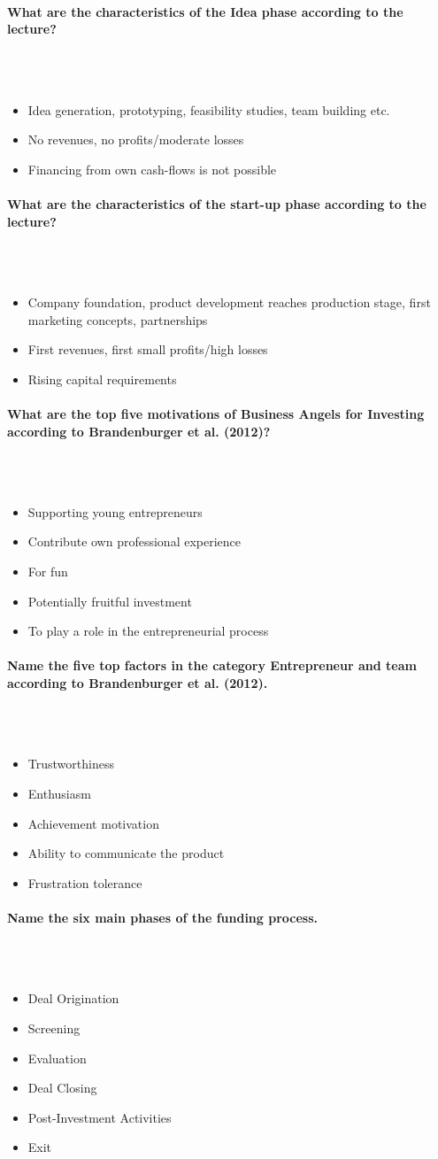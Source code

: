 \documentclass[10pt,a4paper,noendnumber=true]{scrartcl}
\newcommand{\properparagraph}[1]{\paragraph{\textcolor{Emerald}{#1}}\mbox{}\\}
\begin{document}
\properparagraph{What are the characteristics of the Idea phase according to the lecture?}
\\[-6ex]
\begin{itemize}
	\item Idea generation, prototyping, feasibility studies, team	building etc.
	\item No revenues, no profits/moderate losses
	\item Financing from own cash-flows is not possible
\end{itemize}


\properparagraph{What are the characteristics of the start-up phase according to the lecture?}
\\[-6ex]
\begin{itemize}
	\item Company foundation, product development reaches production stage, first marketing concepts, partnerships
	\item First revenues, first small profits/high losses
	\item Rising capital requirements
\end{itemize}


\properparagraph{What are the top five motivations of Business Angels for Investing according to Brandenburger et al. (2012)?}
\\[-6ex]
\begin{itemize}
	\item Supporting young entrepreneurs
	\item Contribute own professional experience
	\item For fun
	\item Potentially fruitful investment
	\item To play a role in the entrepreneurial process	
\end{itemize}

\properparagraph{Name the five top factors in the category Entrepreneur and team according to Brandenburger et al. (2012).}
\\[-6ex]
\begin{itemize}
	\item Trustworthiness
	\item Enthusiasm
	\item Achievement motivation
	\item Ability to communicate the product
	\item Frustration tolerance
\end{itemize}

\properparagraph{Name the six main phases of the funding process.}
\\[-6ex]
\begin{itemize}
	\item Deal Origination
	\item Screening
	\item Evaluation
	\item Deal Closing
	\item Post-Investment Activities
	\item Exit
\end{itemize}
\end{document}
